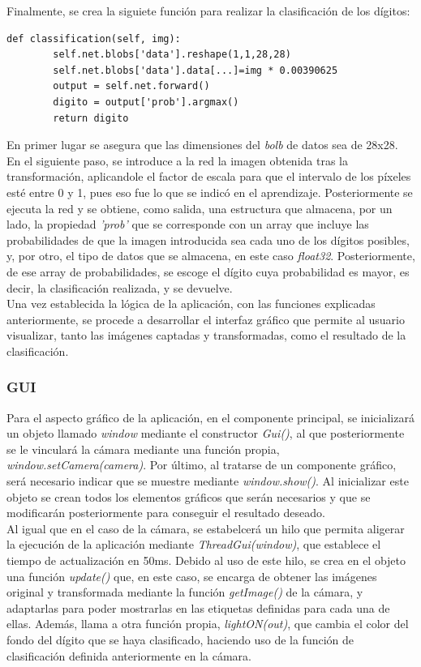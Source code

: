 Finalmente, se crea la siguiete función para realizar la clasificación de los dígitos:
\vspace{10pt}
\begin{lstlisting}[frame=single]
	def classification(self, img):
		self.net.blobs['data'].reshape(1,1,28,28)
		self.net.blobs['data'].data[...]=img * 0.00390625
		output = self.net.forward()
		digito = output['prob'].argmax()
		return digito
\end{lstlisting}

En primer lugar se asegura que las dimensiones del \textit{bolb} de datos sea de 28x28. En el siguiente paso, se introduce a la red la imagen obtenida tras la transformación, aplicandole el factor de escala para que el intervalo de los píxeles esté entre 0 y 1, pues eso fue lo que se indicó en el aprendizaje. Posteriormente se ejecuta la red y se obtiene, como salida, una estructura que almacena, por un lado, la propiedad \textit{'prob'} que se corresponde con un array que incluye las probabilidades de que la imagen introducida sea cada uno de los dígitos posibles, y, por otro, el tipo de datos que se almacena, en este caso \textit{float32}. Posteriormente, de ese array de probabilidades, se escoge el dígito cuya probabilidad es mayor, es decir, la clasificación realizada, y se devuelve.\\

Una vez establecida la lógica de la aplicación, con las funciones explicadas anteriormente, se procede a desarrollar el interfaz gráfico que permite al usuario visualizar, tanto las imágenes captadas y transformadas, como el resultado de la clasificación.\\

\subsubsection{GUI}
Para el aspecto gráfico de la aplicación, en el componente principal, se inicializará un objeto llamado \textit{window} mediante el constructor \textit{Gui()}, al que posteriormente se le vinculará la cámara mediante una función propia, \textit{window.setCamera(camera)}. Por último, al tratarse de un componente gráfico, será necesario indicar que se muestre mediante \textit{window.show()}. Al inicializar este objeto se crean todos los elementos gráficos que serán necesarios y que se modificarán posteriormente para conseguir el resultado deseado.\\

Al igual que en el caso de la cámara, se estabelcerá un hilo que permita aligerar la ejecución de la aplicación mediante \textit{ThreadGui(window)}, que establece el tiempo de actualización en 50ms. Debido al uso de este hilo, se crea en el objeto una función \textit{update()} que, en este caso, se encarga de obtener las imágenes original y transformada mediante la función \textit{getImage()} de la cámara, y adaptarlas para poder mostrarlas en las etiquetas definidas para cada una de ellas. Además, llama a otra función propia, \textit{lightON(out)}, que cambia el color del fondo del dígito que se haya clasificado, haciendo uso de la función de clasificación definida anteriormente en la cámara.\\

